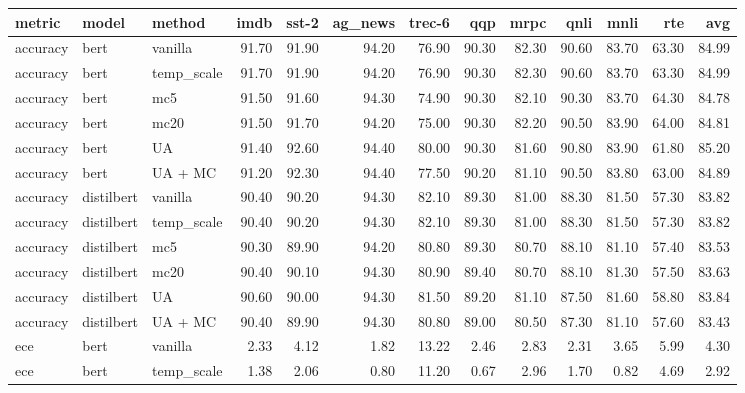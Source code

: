 \begin{tabular}{lllrrrrrrrrrr}
\toprule
   metric &       model &      method &   imdb &  sst-2 &  ag\_news &  trec-6 &    qqp &   mrpc &   qnli &   mnli &    rte &    avg \\
\midrule
 accuracy &        bert &     vanilla &  91.70 &  91.90 &    94.20 &   76.90 &  90.30 &  82.30 &  90.60 &  83.70 &  63.30 &  84.99 \\
 accuracy &        bert &  temp\_scale &  91.70 &  91.90 &    94.20 &   76.90 &  90.30 &  82.30 &  90.60 &  83.70 &  63.30 &  84.99 \\
 accuracy &        bert &         mc5 &  91.50 &  91.60 &    94.30 &   74.90 &  90.30 &  82.10 &  90.30 &  83.70 &  64.30 &  84.78 \\
 accuracy &        bert &        mc20 &  91.50 &  91.70 &    94.20 &   75.00 &  90.30 &  82.20 &  90.50 &  83.90 &  64.00 &  84.81 \\
 accuracy &        bert &          UA &  91.40 &  92.60 &    94.40 &   80.00 &  90.30 &  81.60 &  90.80 &  83.90 &  61.80 &  85.20 \\
 accuracy &        bert &     UA + MC &  91.20 &  92.30 &    94.40 &   77.50 &  90.20 &  81.10 &  90.50 &  83.80 &  63.00 &  84.89 \\
 accuracy &  distilbert &     vanilla &  90.40 &  90.20 &    94.30 &   82.10 &  89.30 &  81.00 &  88.30 &  81.50 &  57.30 &  83.82 \\
 accuracy &  distilbert &  temp\_scale &  90.40 &  90.20 &    94.30 &   82.10 &  89.30 &  81.00 &  88.30 &  81.50 &  57.30 &  83.82 \\
 accuracy &  distilbert &         mc5 &  90.30 &  89.90 &    94.20 &   80.80 &  89.30 &  80.70 &  88.10 &  81.10 &  57.40 &  83.53 \\
 accuracy &  distilbert &        mc20 &  90.40 &  90.10 &    94.30 &   80.90 &  89.40 &  80.70 &  88.10 &  81.30 &  57.50 &  83.63 \\
 accuracy &  distilbert &          UA &  90.60 &  90.00 &    94.30 &   81.50 &  89.20 &  81.10 &  87.50 &  81.60 &  58.80 &  83.84 \\
 accuracy &  distilbert &     UA + MC &  90.40 &  89.90 &    94.30 &   80.80 &  89.00 &  80.50 &  87.30 &  81.10 &  57.60 &  83.43 \\
      ece &        bert &     vanilla &   2.33 &   4.12 &     1.82 &   13.22 &   2.46 &   2.83 &   2.31 &   3.65 &   5.99 &   4.30 \\
      ece &        bert &  temp\_scale &   1.38 &   2.06 &     0.80 &   11.20 &   0.67 &   2.96 &   1.70 &   0.82 &   4.69 &   2.92 \\

\end{tabular}
